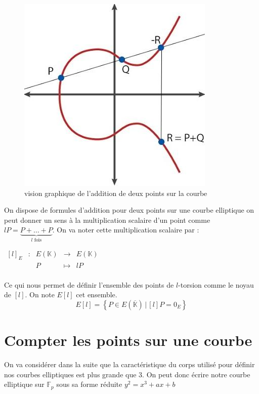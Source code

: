\documentclass[12pt]{article}
\begin{document}
\begin{figure}[h!]
\includegraphics[scale=0.7]{pictures/hqdefault.jpg} 
\caption{vision graphique de l'addition de deux points sur la courbe}
\end{figure}


On dispose de formules d'addition pour deux points sur une courbe elliptique on peut donner un sens à la multiplication scalaire d'un point comme $lP = \underbrace{P + \ldots + P}_{l \text{ fois}}$. On va noter cette multiplication scalaire par :
\newline

$\begin{array}{ccccc}
[l]_E & : & E(\mathbb{K}) & \to & E(\mathbb{K}) \\
 & & P & \mapsto & lP\\
\end{array}$

Ce qui nous permet de définir l'ensemble des points de $l$-torsion comme le noyau de $[l]$. On note $E[l]$ cet ensemble.
\newline
$$E[l] = \left\{ P \in E(\overline{\mathbb{K}}) \, | \, [l]P = 0_E \right\} $$

\section{Compter les points sur une courbe}
On va considérer dans la suite que la caractéristique du corps utilisé pour définir nos courbes elliptiques est plus grande que $3$. On peut donc écrire notre courbe elliptique sur $\mathbb{F}_p$ sous sa forme réduite $y^2 = x^3 + ax+b$
\end{document}
